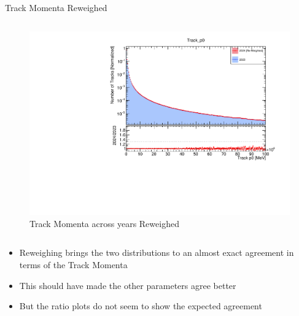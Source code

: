 \begin{frame}{Track Momenta Reweighed}
\begin{columns}
\begin{column}{0.5\linewidth}
\begin{figure}
                \includegraphics[width=\linewidth]{./ReweighedPlots/Track_p0_Reweighted.pdf}
                \caption{Track Momenta across years Reweighed}
            \end{figure}
        \end{column}
    \end{columns}
    \begin{itemize}
        \small
        \item Reweighing brings the two distributions to an almost exact agreement in terms of the Track Momenta
        \item This should have made the other parameters agree better
        \item But the ratio plots do not seem to show the expected agreement
    \end{itemize}
\end{frame}

